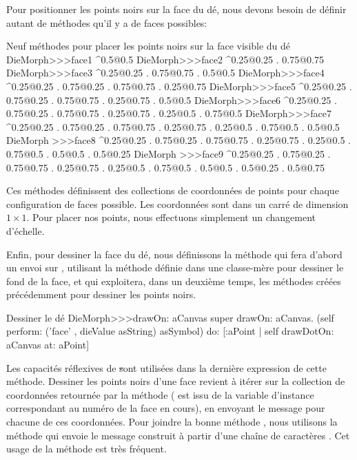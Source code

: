 \documentclass[a4paper,10pt,twoside]{book}
\begin{document}
Pour positionner les points noirs sur la face du dé, nous devons
besoin de définir autant de méthodes qu'il y a de faces possibles:

\begin{methods}{Neuf méthodes pour placer les points noirs sur la face visible du dé}
DieMorph>>>face1
	^{0.5@0.5}
DieMorph>>>face2
	^{0.25@0.25 . 0.75@0.75}
DieMorph>>>face3
	^{0.25@0.25 . 0.75@0.75 . 0.5@0.5}
DieMorph>>>face4
	^{0.25@0.25 . 0.75@0.25 . 0.75@0.75 . 0.25@0.75}
DieMorph>>>face5
	^{0.25@0.25 . 0.75@0.25 . 0.75@0.75 . 0.25@0.75 . 0.5@0.5}
DieMorph>>>face6
	^{0.25@0.25 . 0.75@0.25 . 0.75@0.75 . 0.25@0.75 . 0.25@0.5 . 0.75@0.5}
DieMorph>>>face7
	^{0.25@0.25 . 0.75@0.25 . 0.75@0.75 . 0.25@0.75 . 0.25@0.5 . 0.75@0.5 . 0.5@0.5}
DieMorph >>>face8
	^{0.25@0.25 . 0.75@0.25 . 0.75@0.75 . 0.25@0.75 . 0.25@0.5 . 0.75@0.5 . 0.5@0.5 . 0.5@0.25}
DieMorph >>>face9
	^{0.25@0.25 . 0.75@0.25 . 0.75@0.75 . 0.25@0.75 . 0.25@0.5 . 0.75@0.5 . 0.5@0.5 . 0.5@0.25 . 0.5@0.75}
\end{methods}

Ces méthodes définissent des collections de coordonnées de
points pour chaque configuration de faces possible. Les coordonnées
sont dans un carré de dimension $1\times1$. Pour placer nos points,
nous effectuons simplement un changement d'échelle.

Enfin, pour dessiner la face du dé, nous définissons la méthode
 qui fera d'abord un envoi sur , utilisant la méthode
définie dans une classe-mère pour dessiner le fond de la face, et
qui exploitera, dans un deuxième temps, les méthodes créées
précédemment pour dessiner les points noirs.

\begin{method}{Dessiner le dé}
DieMorph>>>drawOn: aCanvas
	super drawOn: aCanvas.
	(self perform: ('face' , dieValue asString) asSymbol)
		do: [:aPoint | self drawDotOn: aCanvas at: aPoint]
\end{method}

Les capacités réflexives de \st sont utilisées dans la
dernière expression de cette méthode. Dessiner les points noirs
d'une face revient à itérer sur la collection 
de coordonnées retournée par la méthode  
( est issu de la variable d'instance 
correspondant au numéro de la face en cours),
en envoyant le message  pour chacune de ces
coordonnées. Pour joindre la bonne méthode %
, nous utilisons la méthode  qui
envoie le message construit à partir d'une chaîne de
caractères .
Cet usage de la méthode  est très fréquent.
\end{document}
